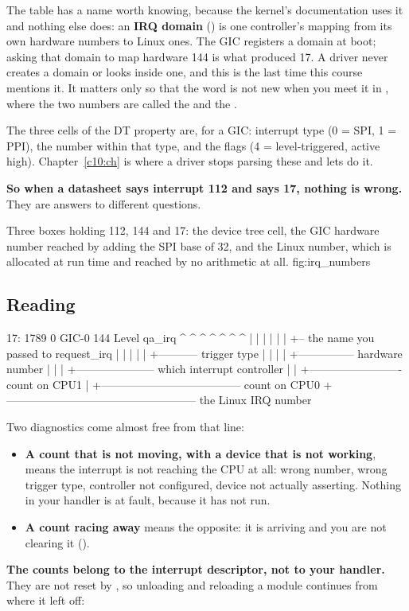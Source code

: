 The table has a name worth knowing, because the kernel's documentation uses it and nothing else
does: an \textbf{IRQ domain} () is one controller's mapping from its own
hardware numbers to Linux ones. The GIC registers a domain at boot; asking that domain to map
hardware 144 is what produced 17. A driver never creates a domain or looks inside one, and this is
the last time this course mentions it. It matters only so that the word is not new when you meet it
in , where the two numbers are called the  and the
.

The three cells of the DT property are, for a GIC: interrupt type (0 = SPI, 1 = PPI), the number
within that type, and the flags (4 = level-triggered, active high). Chapter~\ref{c10:ch} is where a
driver stops parsing these and lets  do it.

\textbf{So when a datasheet says interrupt 112 and  says 17, nothing is
wrong.} They are answers to different questions.

  {Three boxes holding 112, 144 and 17: the device tree cell, the GIC hardware number reached by adding
   the SPI base of 32, and the Linux number, which is allocated at run time and reached by no
   arithmetic at all.}
  {fig:irq_numbers}

\subsection{Reading }
\label{c8:app:a2}

\begin{console}
 17:       1789          0  GIC-0 144 Level     qa_irq
 ^          ^            ^   ^     ^   ^        ^
 |          |            |   |     |   |        +-- the name you passed to request_irq
 |          |            |   |     |   +----------- trigger type
 |          |            |   |     +--------------- hardware number
 |          |            |   +--------------------- which interrupt controller
 |          |            +------------------------- count on CPU1
 |          +-------------------------------------- count on CPU0
 +--------------------------------------------------- the Linux IRQ number
\end{console}

\noindent Two diagnostics come almost free from that line:
\begin{itemize}
  \item \textbf{A count that is not moving, with a device that is not working}, means the interrupt
    is not reaching the CPU at all: wrong number, wrong trigger type, controller not configured,
    device not actually asserting. Nothing in your handler is at fault, because it has not run.
  \item \textbf{A count racing away} means the opposite: it is arriving and you are not clearing it
    ().
\end{itemize}
\textbf{The counts belong to the interrupt descriptor, not to your handler.} They are not reset by
, so unloading and reloading a module continues from where it left off:

